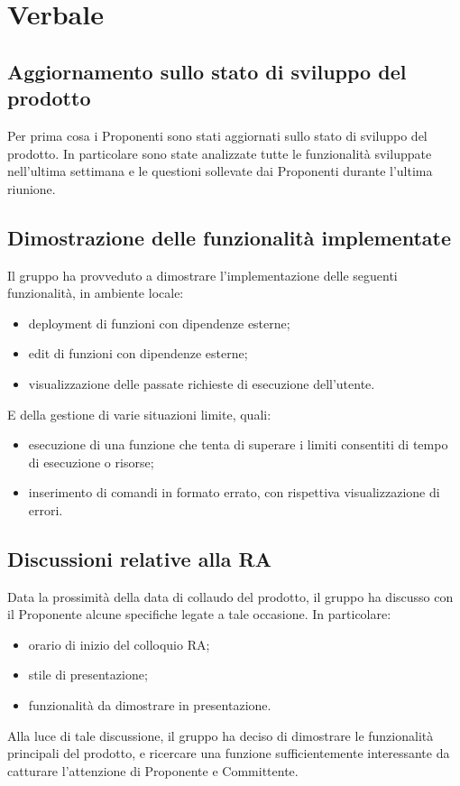 \section{Verbale}
\subsection{Aggiornamento sullo stato di sviluppo del prodotto}
Per prima cosa i Proponenti sono stati aggiornati sullo stato di sviluppo del prodotto. In particolare sono state analizzate tutte le funzionalità sviluppate nell'ultima settimana e le questioni sollevate dai Proponenti durante l'ultima riunione. 

\subsection{Dimostrazione delle funzionalità implementate}
Il gruppo ha provveduto a dimostrare l'implementazione delle seguenti funzionalità, in ambiente locale:
\begin{itemize}
	\item deployment di funzioni con dipendenze esterne;
	\item edit di funzioni con dipendenze esterne;
	\item visualizzazione delle passate richieste di esecuzione dell'utente.
\end{itemize}
E della gestione di varie situazioni limite, quali:
\begin{itemize}
	\item esecuzione di una funzione che tenta di superare i limiti consentiti di tempo di esecuzione o risorse;
	\item inserimento di comandi in formato errato, con rispettiva visualizzazione di errori.
\end{itemize}

\subsection{Discussioni relative alla RA}
Data la prossimità della data di collaudo del prodotto, il gruppo ha discusso con il Proponente alcune specifiche legate a tale occasione. In particolare:
\begin{itemize}
	\item orario di inizio del colloquio RA;
	\item stile di presentazione;
	\item funzionalità da dimostrare in presentazione.
\end{itemize}
Alla luce di tale discussione, il gruppo ha deciso di dimostrare le funzionalità principali del prodotto, e ricercare una funzione sufficientemente interessante da catturare l'attenzione di Proponente e Committente.
